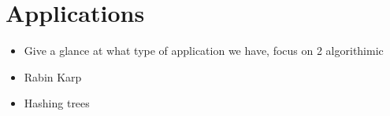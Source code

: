 \chapter{Applications}
\label{cap:Applications}

\begin{itemize}
\item Give a glance at what type of application we have, focus on 2 algorithimic
\item Rabin Karp
\item Hashing trees
\end{itemize}